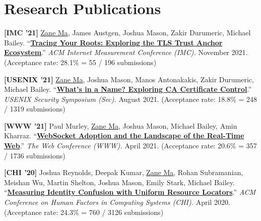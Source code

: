 \documentclass[10pt,singlecolumn]{article} %
\begin{document}
\section{Research Publications} 

\begin{etaremune}

\item \textbf{[IMC '21]} 
\underline{Zane Ma}, James Austgen, Joshua Mason, Zakir Durumeric, Michael Bailey.
``\textbf{\href{https://zanema.com/papers/imc21_roots.pdf}{Tracing Your Roots: Exploring the TLS Trust Anchor Ecosystem}}.''
\emph{ACM Internet Measurement Conference (IMC).} November 2021.
(Acceptance rate: 28.1\% = 55 / 196 submissions)
\vspace{6pt}


\item \textbf{[USENIX '21]}
\underline{Zane Ma}, Joshua Mason, Manos Antonakakis, Zakir Durumeric, Michael Bailey.
``\textbf{\href{https://zanema.com/papers/usenix21_ca_operators.pdf}{What's in a Name? Exploring CA Certificate Control}}.''
\emph{USENIX Security Symposium (Sec).} August 2021.
(Acceptance rate: 18.8\% = 248 / 1319 submissions)  
\vspace{6pt}


\item \textbf{[WWW '21]}
Paul Murley, \underline{Zane Ma}, Joshua Mason, Michael Bailey, Amin Kharraz.
``\textbf{\href{https://zanema.com/papers/www21_websockets.pdf}{WebSocket Adoption and the Landscape of the Real-Time Web}}.''
\emph{The Web Conference (WWW).} April 2021.
(Acceptance rate: 20.6\% = 357 / 1736 submissions)
\vspace{6pt}


\item \textbf{[CHI '20]}
Joshua Reynolds, Deepak Kumar, \underline{Zane Ma}, Rohan Subramanian, Meishan Wu, Martin Shelton, Joshua Mason, Emily Stark, Michael Bailey.
``\textbf{\href{https://zanema.com/papers/chi20_urlconfusion.pdf}{Measuring Identity Confusion with Uniform Resource Locators}}.''
\emph{ACM Conference on Human Factors in Computing Systems (CHI).} April 2020.
(Acceptance rate: 24.3\% = 760 / 3126 submissions)
\vspace{6pt}


\end{etaremune}
\end{document}
